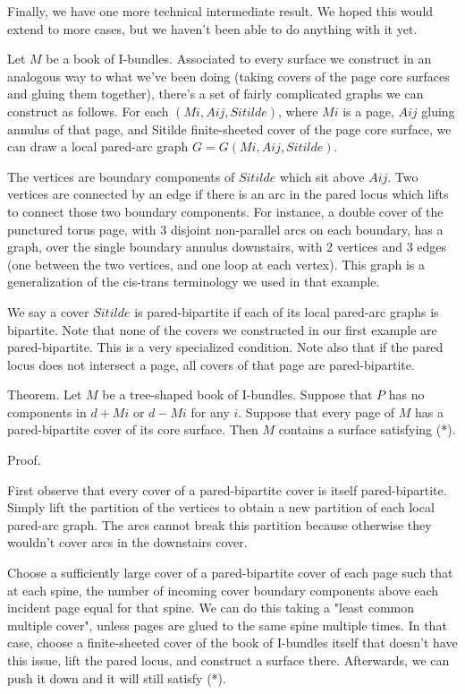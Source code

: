\documentclass[12pt]{amsart}
\theoremstyle{definition}
\begin{document}
Finally, we have one more technical intermediate result. We hoped this would
extend to more cases, but we haven't been able to do anything with it yet.

Let $M$ be a book of I-bundles. Associated to every surface we construct in an
analogous way to what we've been doing (taking covers of the page core surfaces
and gluing them together), there's a set of fairly complicated graphs we can
construct as follows. For each $(Mi,Aij,Sitilde)$, where $Mi$ is a page, $Aij$ gluing
annulus of that page, and Sitilde finite-sheeted cover of the page core
surface, we can draw a local pared-arc graph $G=G(Mi,Aij,Sitilde)$.

The vertices are boundary components of $Sitilde$ which sit above $Aij$. Two
vertices are connected by an edge if there is an arc in the pared locus which
lifts to connect those two boundary components. For instance, a double cover of
the punctured torus page, with 3 disjoint non-parallel arcs on each boundary,
has a graph, over the single boundary annulus downstairs,  with 2 vertices and
3 edges (one between the two vertices, and one loop at each vertex). This graph
is a generalization of the cis-trans terminology we used in that example.

We say a cover $Sitilde$ is pared-bipartite if each of its local pared-arc
graphs is bipartite. Note that none of the covers we constructed in our first
example are pared-bipartite. This is a very specialized condition. Note also
that if the pared locus does not intersect a page, all covers of that page are
pared-bipartite.

Theorem. Let $M$ be a tree-shaped book of I-bundles. Suppose that $P$ has no
components in $d+Mi$ or $d-Mi$ for any $i$. Suppose that every page of $M$ has
a pared-bipartite cover of its core surface. Then $M$ contains a surface
satisfying (*).

Proof.

First observe that every cover of a pared-bipartite cover is itself
pared-bipartite. Simply lift the partition of the vertices to obtain a new
partition of each local pared-arc graph. The arcs cannot break this
partition because otherwise they wouldn't cover arcs in the downstairs cover.

Choose a sufficiently large cover of a pared-bipartite cover of each page such
that at each spine, the number of incoming cover boundary components above each
incident page equal for that spine. We can do this taking a "least common
multiple cover", unless pages are glued to the same spine multiple times. In
that case, choose a finite-sheeted cover of the book of I-bundles itself that
doesn't have this issue, lift the pared locus, and construct a surface there.
Afterwards, we can push it down and it will still satisfy (*).
\end{document}
